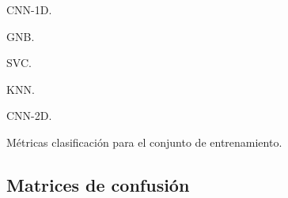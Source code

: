     \begin{table}[H]
        \scriptsize
        \renewcommand{\arraystretch}{1.1}
        \begin{subtable}{.5\textwidth}        
          \caption{CNN-1D.}
          \label{TrainClassificationReport:CNN1D}
        \end{subtable}
        \hspace{1em}
        \begin{subtable}{.5\textwidth}
          \caption{GNB.}
          \label{TrainClassificationReport:GNB}
        \end{subtable}
        \vspace*{2mm}
        \begin{subtable}{.5\textwidth}  
          \centering
          \caption{SVC.}
          \label{TrainClassificationReport:SVC}
        \end{subtable}
        \hspace{1em}
        \begin{subtable}{.5\textwidth}
          \caption{KNN.}
          \label{TrainClassificationReport:KNN}
        \end{subtable}
        \vspace*{2mm}
        \begin{subtable}{1\textwidth}
          \centering
          \caption{CNN-2D.}
          \label{TrainClassificationReport:CNN2D}
        \end{subtable}
        \caption{Métricas clasificación para el conjunto de entrenamiento.}
        \label{TrainClassificationReport}
    \end{table}

  \subsection{Matrices de confusión}

